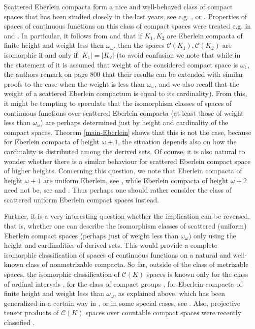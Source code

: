 \documentclass{amsart}
\numberwithin{equation}{section}
\theoremstyle{definition}
\def\C{\mathcal C}
\newcommand{\abs}[1]{\left| #1  \right|}
\begin{document}
Scattered Eberlein compacta form a nice and well-behaved class of compact spaces that has been studied closely in the last years, see e.g. \cite{Bell2007OnSE}, \cite{Bell_Marciszewski_univeral_eberlein} or \cite{Marciszewski_eberlein_problems}. Properties of spaces of continuous functions on this class of compact spaces were treated e.g. in \cite{Godefroy2000SubspacesO} and \cite{Marciszewski2003OnBS}. In particular, it follows from \cite[Theorem 4.8]{Godefroy2000SubspacesO} and \cite{cengiz} that if $K_1, K_2$ are Eberlein compacta of finite height and weight less then $\omega_{\omega}$, then the spaces $\C(K_1), \C(K_2)$ are isomorphic if and only if $\abs{K_1}=\abs{K_2}$ (to avoid confusion we note that while in the statement of \cite[Theorem 4.8]{Godefroy2000SubspacesO} it is assumed that weight of the considered compact space is $\omega_1$, the authors remark on page 800 that their results can be extended with similar proofs to the case when the weight is less than $\omega_{\omega}$, and we also recall that the weight of a scattered Eberlein compactum is equal to its cardinality). From this, it might be tempting to speculate that the isomorphism classes of spaces of continuous functions over scattered Eberlein compacta (at least those of weight less than $\omega_{\omega}$) are perhaps determined just by height and cardinality of the compact spaces. Theorem \ref{main-Eberlein} shows that this is not the case, because for Eberlein compacta of height $\omega+1$, the situation depends also on how the cardinality is distributed among the derived sets. Of course, it is also natural to wonder whether there is a similar behaviour for scattered Eberlein compact space of higher heights. Concerning this question, we note that Eberlein compacta of height $\omega+1$ are uniform Eberlein, see \cite{Bell2007OnSE}, while Eberlein compacta of height $\omega+2$ need not be, see \cite{BenyaminiStarbird_UniformEberlein} and \cite{Marciszewski_sequentiall}. Thus perhaps one should rather consider the class of scattered uniform Eberlein compact spaces instead. 

Further, it is a very interesting question whether the implication can be reversed, that is, whether one can describe the isomorphism classes of scattered (uniform) Eberlein compact spaces (perhaps just of weight less than $\omega_{\omega}$) only using the height and cardinalities of derived sets. This would provide a complete isomorphic classification of spaces of continuous functions on a natural and well-known class of nonmetrizable compacta. So far, outside of the class of metrizable spaces, the isomorphic classification of $\C(K)$ spaces is known only for the class of ordinal intervals \cite{Kislyakov_classification}, for the class of compact groups \cite{Pelczynski_book_1968}, for Eberlein compacta of finite height and weight less than $\omega_{\omega}$, as explained above, which has been generalized in a certain way in \cite{Aviles_classification}, or in some special cases, see \cite{Galego_classification}. Also, projective tensor products of $\C(K)$ spaces over countable compact spaces were recently classified \cite{GalegoCauseySamuel_projective_classification}.
\end{document}
